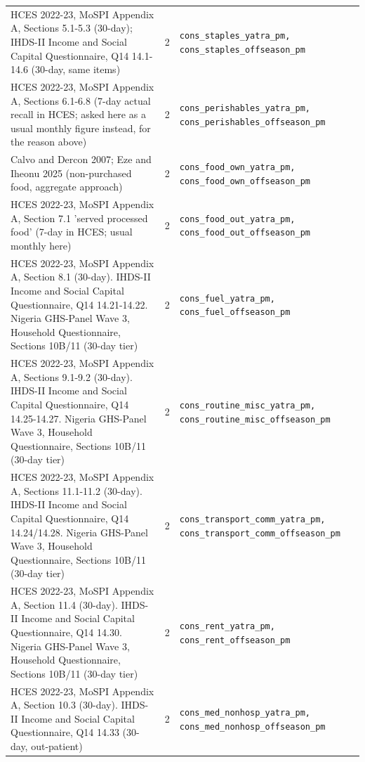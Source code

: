 \documentclass[9pt,a4paper,landscape]{article}
\begin{document}
\begin{longtable}{@{}p{9.5cm}p{1.2cm}p{12.5cm}@{}}
\scriptsize HCES 2022-23, MoSPI Appendix A, Sections 5.1-5.3 (30-day); IHDS-II Income and Social Capital Questionnaire, Q14 14.1-14.6 (30-day, same items) & \scriptsize 2 & \scriptsize\texttt{cons\_staples\_yatra\_pm, cons\_staples\_offseason\_pm}\\
\scriptsize HCES 2022-23, MoSPI Appendix A, Sections 6.1-6.8 (7-day actual recall in HCES; asked here as a usual monthly figure instead, for the reason above) & \scriptsize 2 & \scriptsize\texttt{cons\_perishables\_yatra\_pm, cons\_perishables\_offseason\_pm}\\
\scriptsize Calvo and Dercon 2007; Eze and Iheonu 2025 (non-purchased food, aggregate approach) & \scriptsize 2 & \scriptsize\texttt{cons\_food\_own\_yatra\_pm, cons\_food\_own\_offseason\_pm}\\
\scriptsize HCES 2022-23, MoSPI Appendix A, Section 7.1 'served processed food' (7-day in HCES; usual monthly here) & \scriptsize 2 & \scriptsize\texttt{cons\_food\_out\_yatra\_pm, cons\_food\_out\_offseason\_pm}\\
\scriptsize HCES 2022-23, MoSPI Appendix A, Section 8.1 (30-day). IHDS-II Income and Social Capital Questionnaire, Q14 14.21-14.22. Nigeria GHS-Panel Wave 3, Household Questionnaire, Sections 10B/11 (30-day tier) & \scriptsize 2 & \scriptsize\texttt{cons\_fuel\_yatra\_pm, cons\_fuel\_offseason\_pm}\\
\scriptsize HCES 2022-23, MoSPI Appendix A, Sections 9.1-9.2 (30-day). IHDS-II Income and Social Capital Questionnaire, Q14 14.25-14.27. Nigeria GHS-Panel Wave 3, Household Questionnaire, Sections 10B/11 (30-day tier) & \scriptsize 2 & \scriptsize\texttt{cons\_routine\_misc\_yatra\_pm, cons\_routine\_misc\_offseason\_pm}\\
\scriptsize HCES 2022-23, MoSPI Appendix A, Sections 11.1-11.2 (30-day). IHDS-II Income and Social Capital Questionnaire, Q14 14.24/14.28. Nigeria GHS-Panel Wave 3, Household Questionnaire, Sections 10B/11 (30-day tier) & \scriptsize 2 & \scriptsize\texttt{cons\_transport\_comm\_yatra\_pm, cons\_transport\_comm\_offseason\_pm}\\
\scriptsize HCES 2022-23, MoSPI Appendix A, Section 11.4 (30-day). IHDS-II Income and Social Capital Questionnaire, Q14 14.30. Nigeria GHS-Panel Wave 3, Household Questionnaire, Sections 10B/11 (30-day tier) & \scriptsize 2 & \scriptsize\texttt{cons\_rent\_yatra\_pm, cons\_rent\_offseason\_pm}\\
\scriptsize HCES 2022-23, MoSPI Appendix A, Section 10.3 (30-day). IHDS-II Income and Social Capital Questionnaire, Q14 14.33 (30-day, out-patient) & \scriptsize 2 & \scriptsize\texttt{cons\_med\_nonhosp\_yatra\_pm, cons\_med\_nonhosp\_offseason\_pm}\\

\end{longtable}
\end{document}
